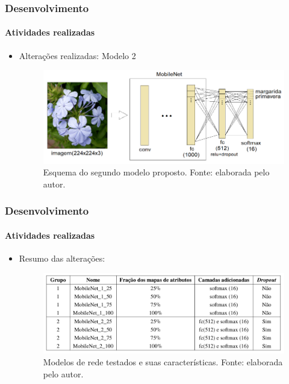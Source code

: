 \documentclass{beamer}
\begin{document}
    \begin{frame}
      \frametitle{Desenvolvimento}
      \framesubtitle{Atividades realizadas}      
      \begin{itemize}
        \item<1-> Alterações realizadas: Modelo 2
        		 \begin{figure}[hbt]
      		 	\begin{center}
      				\includegraphics[height=0.35\textwidth]{img/model2.png}
      			\end{center}
      			    \caption{Esquema do segundo modelo proposto. Fonte: elaborada pelo autor.}
      		\end{figure}
      \end{itemize}
    \end{frame}
    
    \begin{frame}
      \frametitle{Desenvolvimento}
      \framesubtitle{Atividades realizadas}      
      \begin{itemize}
        \item<1-> Resumo das alterações: \medskip
        \begin{figure}[hbt]
      		 	\begin{center}
      				\includegraphics[height=.3 \textwidth]{img/models_table.png}
      			\end{center}
      			\caption{Modelos de rede testados e suas características. Fonte: elaborada pelo autor.}
      		\end{figure}
      \end{itemize}
    \end{frame}
    
\end{document}
